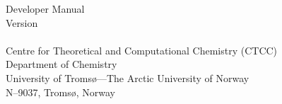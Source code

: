 \documentclass[a4paper,11pt,final]{book}
\begin{document}
\begin{titlepage}
  \centering
  \vspace*{\fill}
  {\huge\LibName Developer Manual\\
   Version \LibVersion}\\
  \vspace*{\fill}
  {\Large\LibAuthor}\\
  \vspace*{\fill}
  {\Large Centre for Theoretical and Computational Chemistry (CTCC)\\
   Department of Chemistry\\
   University of Troms{\o}---The Arctic University of Norway\\
   N--9037, Troms{\o}, Norway}
  \vspace*{\fill}
\end{titlepage}

\clearpage



\tableofcontents

\pagestyle{noweb}





%

%







\printindex
\end{document}
